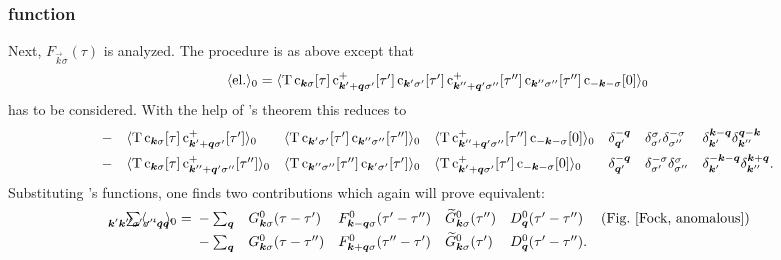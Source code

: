 \subsubsection{ function}

Next, $F_{\vec k \sigma}(\tau)$ is analyzed. The procedure is as above except
that
%
\begin{align*}
    \av{\text{el.}}_0= \av{\op T \,
        \op c_{\vec k \sigma}[\tau] \,
        \op c_{\vec k' + \vec q \sigma'}^+[\tau'] \,
        \op c_{\vec k' \sigma'}[\tau'] \,
        \op c_{\vec k'' + \vec q' \sigma''}^+[\tau''] \,
        \op c_{\vec k'' \sigma''}[\tau''] \,
        \op c_{-\vec k -\sigma}[0]}_0
\end{align*}
%
has to be considered. With the help of 's theorem this reduces to
%
\begingroup
    \def\minalignsep{0pt}
    \begin{align*}
        &-
        && \av{\op T \, \op c_{\vec k \sigma}[\tau]
        \, \op c_{\vec k' + \vec q \sigma'}^+[\tau']}_0
        && \av{\op T \, \op c_{\vec k' \sigma'}[\tau']
        \, \op c_{\vec k'' \sigma''}[\tau'']}_0
        && \av{\op T \, \op c_{\vec k'' + \vec q' \sigma''}^+[\tau'']
        \, \op c_{-\vec k -\sigma}[0]}_0
        && \delta_{\vec q'}^{-\vec q}
        && \delta_{\sigma'}^\sigma \delta_{\sigma''}^{-\sigma}
        && \delta_{\vec k'}^{\vec k - \vec q}
           \delta_{\vec k''}^{\vec q - \vec k} \\
        &-
        && \av{\op T \, \op c_{\vec k \sigma}[\tau]
        \, \op c_{\vec k'' + \vec q' \sigma''}^+[\tau'']}_0
        && \av{\op T \, \op c_{\vec k'' \sigma''}[\tau'']
        \, \op c_{\vec k' \sigma'}[\tau']}_0
        && \av{\op T \, \op c_{\vec k' + \vec q \sigma'}^+[\tau']
        \, \op c_{-\vec k -\sigma}[0]}_0
        && \delta_{\vec q'}^{-\vec q}
        && \delta_{\sigma'}^{-\sigma} \delta_{\sigma''}^\sigma
        && \delta_{\vec k'}^{-\vec k - \vec q}
           \delta_{\vec k''}^{\vec k + \vec q}.
    \end{align*}
\endgroup
%
Substituting 's functions, one finds two contributions which again
will prove equivalent:
%
\begin{align*}
    \sum_{\mathclap{\vec k' \vec k'' \sigma' \sigma'' \vec q \vec q'}}
    \av \dots_0 =
    \let\displaystyle\textstyle
    \begin{aligned}[t]
        &- \sum_{\vec q}
        && G^0_{\vec k \sigma}(\tau - \tau')
        && F^0_{\vec k - \vec q \sigma}(\tau' - \tau'')
        && \smash{\widetilde G^0_{\vec k \sigma}}(\tau'')
        && D^0_{\vec q}(\tau' - \tau'')
        &  \text{(Fig.~\ref{Fock, anomalous})} \\
        &- \sum_{\vec q}
        && G^0_{\vec k \sigma}(\tau - \tau'')
        && F^0_{\vec k + \vec q \sigma}(\tau'' - \tau')
        && \smash{\widetilde G^0_{\vec k \sigma}}(\tau')
        && D^0_{\vec q}(\tau' - \tau'').
        &
    \end{aligned}
\end{align*}
